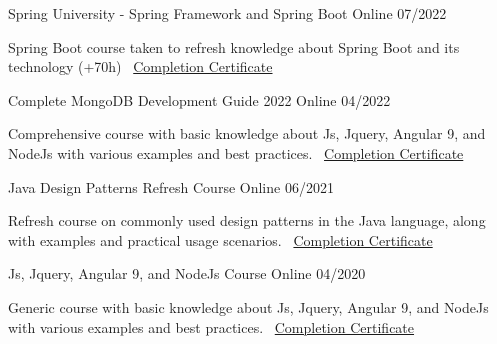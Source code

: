 \documentclass[]{awesome-cv}
\begin{document}
\begin{cventries}
	\cventry
	{}
	{Spring University - Spring Framework and Spring Boot \vspace{-4mm}}
	{Online \vspace{-5mm}}
	{07/2022 \vspace{-5mm}}
	{\begin{cvsectionnormaltext} 
		\item{Spring Boot course taken to refresh knowledge about Spring Boot and its technology (+70h)
		\newline \vspace{2mm} \faLink\ \href{https://www.udemy.com/certificate/UC-ee0ce349-6915-479b-b038-5253aba9d0d8/}{Completion Certificate}}
	\end{cvsectionnormaltext}}
    {}

	\cventry
	{}
	{Complete MongoDB Development Guide 2022 \vspace{-4mm}}
	{Online \vspace{-5mm}}
	{04/2022 \vspace{-5mm}}
	{\begin{cvsectionnormaltext} 
		\item{Comprehensive course with basic knowledge about Js, Jquery, Angular 9, and NodeJs with various examples and best practices.
		\newline \vspace{2mm} \faLink\ \href{https://www.udemy.com/certificate/UC-b990e98a-9b76-44b1-8e3e-43b68213725c/}{Completion Certificate}}
	\end{cvsectionnormaltext}}
    {}
    
	\cventry
	{}
	{Java Design Patterns Refresh Course \vspace{-4mm}}
	{Online \vspace{-5mm}}
	{06/2021 \vspace{-5mm}}
	{\begin{cvsectionnormaltext} 
		\item{Refresh course on commonly used design patterns in the Java language, along with examples and practical usage scenarios.
		\newline \vspace{2mm} \faLink\ \href{https://www.udemy.com/certificate/UC-982e3338-ea7d-4434-bf27-af8e38b77bd5/}{Completion Certificate}}
	\end{cvsectionnormaltext}}
    {}

    
	\cventry
	{}
	{Js, Jquery, Angular 9, and NodeJs Course \vspace{-4mm}}
	{Online \vspace{-5mm}}
	{04/2020 \vspace{-5mm}}
	{\begin{cvsectionnormaltext} 
		\item{Generic course with basic knowledge about Js, Jquery, Angular 9, and NodeJs with various examples and best practices.
		\newline \vspace{2mm} \faLink\ \href{https://www.udemy.com/certificate/UC-012febdf-7657-4e65-8708-ee4e18d5a8e1/}{Completion Certificate}}
	\end{cvsectionnormaltext}}
    {}
\end{cventries}
\end{document}
